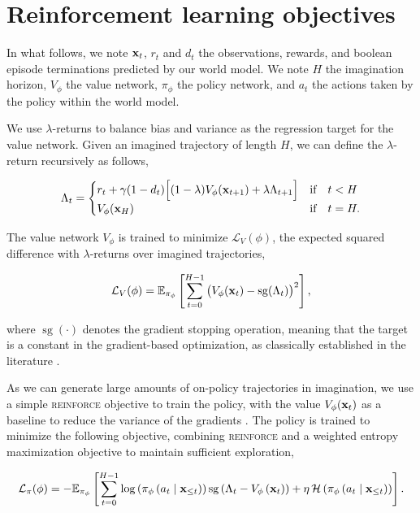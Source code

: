 \section{Reinforcement learning objectives}
\label{appendix:rl_actor_critic}

In what follows, we note $\mathbf{x}_t$, $r_t$ and $d_t$ the observations, rewards, and boolean episode terminations predicted by our world model. We note $H$ the imagination horizon, $V_\phi$ the value network, $\pi_\phi$ the policy network, and $a_t$ the actions taken by the policy within the world model. 

We use $\lambda$-returns to balance bias and variance as the regression target for the value network. Given an imagined trajectory of length $H$, we can define the $\lambda$-return recursively as follows,

\begin{equation}
\Lambda_t = 
\begin{cases}
    r_t + \gamma (1 - d_t) \Big[ (1 - \lambda) V_\phi(\mathbf{x}_{t+1}) + \lambda \Lambda_{t+1} \Big]   & \text{if}\quad t < H \\
    V_\phi(\mathbf{x}_H)                                                                                            & \text{if}\quad t = H. \\
\end{cases}
\end{equation}

The value network $V_\phi$ is trained to minimize $\mathcal{L}_V(\phi)$, the expected squared difference with $\lambda$-returns over imagined trajectories,

\begin{equation}
\mathcal{L}_V(\phi) = \mathbb{E}_{\pi_\phi} \left[ \sum_{t=0}^{H-1} \big( V_\phi(\mathbf{x}_t) - \mathrm{sg} ( \Lambda_t ) \big)^2 \right],
\end{equation}

where $\operatorname{sg}(\cdot)$ denotes the gradient stopping operation, meaning that the target is a constant in the gradient-based optimization, as classically established in the literature \citep{mnih2015dqn,hafner2021mastering,iris2023}.

As we can generate large amounts of on-policy trajectories in imagination, we use a simple \textsc{reinforce} objective to train the policy, with the value $V_\phi(\mathbf{x}_t)$ as a baseline to reduce the variance of the gradients \citep{sutton2018reinforcement}. The policy is trained to minimize the following objective, combining \textsc{reinforce} and a weighted entropy maximization objective to maintain sufficient exploration,

\begin{equation}
\mathcal{L}_\pi(\phi) = - \mathbb{E}_{\pi_\phi} \left[ \sum_{t=0}^{H-1} \log\left(\pi_\phi\left(a_t \mid \mathbf{x}_{\le t}\right)\right) \operatorname{sg}\left(\Lambda_t - V_\phi\left(\mathbf{x}_t\right)\right) + \eta \operatorname{\mathcal{H}}\left(\pi_\phi \left(a_t \mid \mathbf{x}_{\le t} \right) \right)\right].
\end{equation}

\vspace{1cm}

